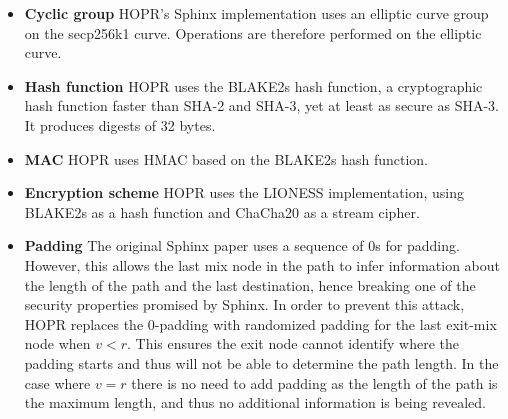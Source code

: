 \begin{itemize}
    \item \textbf{Cyclic group} HOPR's Sphinx implementation uses an elliptic curve group on the secp256k1 curve. Operations are therefore performed on the elliptic curve.

    \item \textbf{Hash function} HOPR uses the BLAKE2s hash function, a cryptographic
        hash function faster than SHA-2 and SHA-3, yet at least as secure as
        SHA-3. It produces digests of 32 bytes.

    \item \textbf{MAC} HOPR uses HMAC based on the BLAKE2s hash function.

    \item \textbf{Encryption scheme} HOPR uses the LIONESS \cite{lionesspaper}
        implementation, using BLAKE2s as a hash function and ChaCha20 as a
        stream cipher.

    \item \textbf{Padding} The original Sphinx paper uses a sequence of 0s
        for padding. However, this allows the last mix node in the path to infer
        information about the length of the path and the last destination, hence
        breaking one of the security properties promised by Sphinx. In order to
        prevent this attack, HOPR replaces the 0-padding with randomized padding
        for the last exit-mix node when $v<r$. This ensures the exit node cannot
        identify where the padding starts and thus will not be able to determine the
        path length. In the case where $v=r$ there is
        no need to add padding as the length of the path is the maximum length,
        and thus no additional information is being revealed.

\end{itemize}

